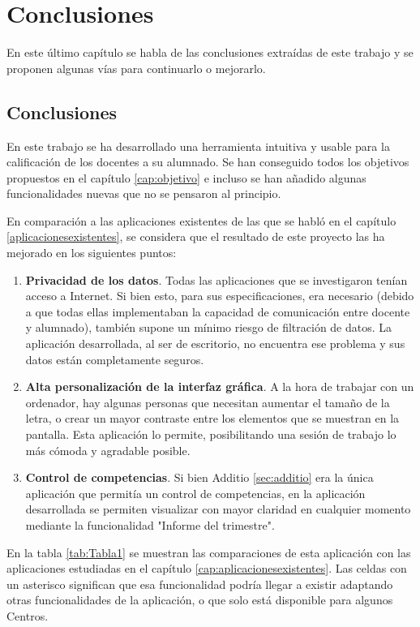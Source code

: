 \chapter{Conclusiones}
\label{cap:conclusiones}
En este último capítulo se habla de las conclusiones extraídas de este trabajo y se proponen algunas vías para continuarlo o mejorarlo.

\section{Conclusiones}
En este trabajo se ha desarrollado una herramienta intuitiva y usable para la calificación de los docentes a su alumnado. Se han conseguido todos los objetivos propuestos en el capítulo \ref{cap:objetivo} e incluso se han añadido algunas funcionalidades nuevas que no se pensaron al principio.

En comparación a las aplicaciones existentes de las que se habló en el capítulo \ref{aplicacionesexistentes}, se considera que el resultado de este proyecto las ha mejorado en los siguientes puntos:
\begin{enumerate}
	\item \textbf{Privacidad de los datos}. Todas las aplicaciones que se investigaron tenían acceso a Internet. Si bien esto, para sus especificaciones, era necesario (debido a que todas ellas implementaban la capacidad de comunicación entre docente y alumnado), también supone un mínimo riesgo de filtración de datos. La aplicación desarrollada, al ser de escritorio, no encuentra ese problema y sus datos están completamente seguros.
	\item \textbf{Alta personalización de la interfaz gráfica}. A la hora de trabajar con un ordenador, hay algunas personas que necesitan aumentar el tamaño de la letra, o crear un mayor contraste entre los elementos que se muestran en la pantalla. Esta aplicación lo permite, posibilitando una sesión de trabajo lo más cómoda y agradable posible.
	\item \textbf{Control de competencias}. Si bien Additio \ref{sec:additio} era la única aplicación que permitía un control de competencias, en la aplicación desarrollada se permiten visualizar con mayor claridad en cualquier momento mediante la funcionalidad "Informe del trimestre".
\end{enumerate}

En la tabla \ref{tab:Tabla1} se muestran las comparaciones de esta aplicación con las aplicaciones estudiadas en el capítulo \ref{cap:aplicacionesexistentes}. Las celdas con un asterisco significan que esa funcionalidad podría llegar a existir adaptando otras funcionalidades de la aplicación, o que solo está disponible para algunos Centros.


